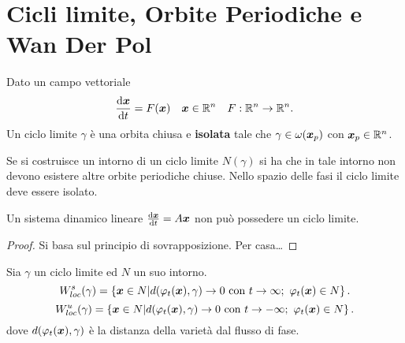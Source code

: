\section{Cicli limite, Orbite Periodiche e Wan Der Pol}%
\label{sub:Cicli limite}
\begin{defn}
    Dato un campo vettoriale 
    \[
	\frac{\text{d} \boldsymbol{x}}{\text{d} t} = F(\boldsymbol{x}) \quad  \boldsymbol{x}\in \mathbb{R}^n \quad  F:\mathbb{R}^n\to \mathbb{R}^n
    .\] 
    Un ciclo limite $\gamma$ è una orbita chiusa e \textbf{isolata} tale che $\gamma  \in \omega (\boldsymbol{x}_p)$ con $\boldsymbol{x}_p \in \mathbb{R}^n$. 
\end{defn}
\noindent
Se si costruisce un intorno di un ciclo limite $N(\gamma)$ si ha che in tale intorno non devono esistere altre orbite periodiche chiuse. Nello spazio delle fasi il ciclo limite deve essere isolato.\\
\begin{thm}
Un sistema dinamico lineare $\frac{\text{d} \boldsymbol{x}}{\text{d} t} = A \boldsymbol{x}$ non può possedere un ciclo limite.
\end{thm}
\noindent
\begin{proof}
    Si basa sul principio di sovrapposizione. 
    Per casa\ldots
\end{proof}
\begin{defn}
    Sia $\gamma$ un ciclo limite ed $N$ un suo intorno.
    \[
	W_{loc}^s(\gamma) = \left\{\boldsymbol{x}\in N| d(\varphi_t(\boldsymbol{x}) , \gamma)\to 0 \text{ con } t\to \infty; \ \varphi_t (\boldsymbol{x}) \in N\right\}
    .\] 
    \[
	W_{loc}^u(\gamma) = \left\{\boldsymbol{x}\in N| d(\varphi_t(\boldsymbol{x}) , \gamma)\to 0 \text{ con } t\to -\infty; \ \varphi_t (\boldsymbol{x}) \in N \right\}
    .\] 
    dove $d(\varphi_t(\boldsymbol{x}), \gamma)$ è la distanza della varietà dal flusso di fase.
\end{defn}
\noindent
